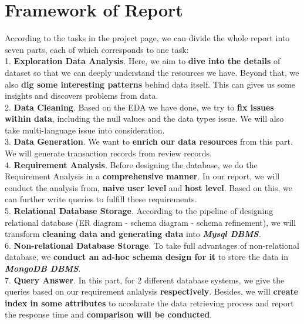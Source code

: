 \documentclass{article}
\begin{document}
	\section{Framework of Report}
	According to the tasks in the project page, we can divide the whole report into seven parts, each of which corresponds to one task:
	\vspace{5pt}
	\\
	1. \textbf{Exploration Data Analysis}. Here, we aim to \textbf{dive into the details} of dataset so that we can deeply understand the resources we have. Beyond that, we also \textbf{dig some interesting patterns} behind data itself. This can gives us some insights and discovers problems from data.
	\\
	2.\textbf{ Data Cleaning}. Based on the EDA we have done, we try to \textbf{fix issues within data}, including the null values and the data types issue. We will also take multi-language issue into consideration.
	\\
	3. \textbf{Data Generation}. We want to \textbf{enrich our data resources} from this part. We will generate transaction records from review records.
	\\
	4. \textbf{Requirement Analysis}. Before designing the database, we do the Requirement Analysis in a \textbf{comprehensive manner}. In our report, we will conduct the analysis from, \textbf{naive user level} and \textbf{host level}. Based on this, we can further write queries to fulfill these requirements.
	\\
	5. \textbf{Relational Database Storage}. According to the pipeline of designing relational database (ER diagram - schema diagram - schema refinement), we will transform \textbf{cleaning data and generating data} into\textit{ \textbf{Mysql DBMS}.}
	\\
	6. \textbf{Non-relational Database Storage}. To take full advantages of  non-relational database, we \textbf{conduct an ad-hoc schema design for it} to store the data in \textbf{\textit{MongoDB DBMS}}.
	\\
	7. \textbf{Query Answer}. In this part, for 2 different database systems, we give the queries based on our requirement anlalysis \textbf{respectively}. Besides, we will \textbf{create index in some attributes} to accelarate the data retrieving process and report the response time and \textbf{comparison will be conducted}.
\end{document}
